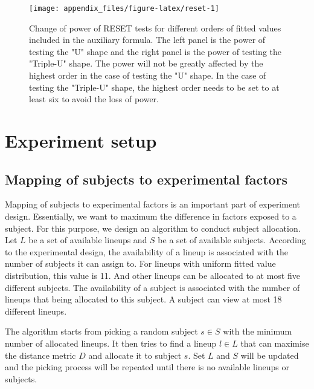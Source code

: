 \documentclass[]{interact}
\theoremstyle{plain}%
\theoremstyle{definition}
\theoremstyle{remark}
\begin{document}
\begin{figure}

{\centering \texttt{[image: appendix\_files/figure-latex/reset-1]} 

}

\caption{Change of power of RESET tests for different orders of fitted values included in the auxiliary formula. The left panel is the power of testing the "U" shape and the right panel is the power of testing the "Triple-U" shape. The power will not be greatly affected by the highest order in the case of testing the "U" shape. In the case of testing the "Triple-U" shape, the highest order needs to be set to at least six to avoid the loss of power.}\label{fig:reset}
\end{figure}

\newpage

\hypertarget{experiment-setup}{%
\section{Experiment setup}\label{experiment-setup}}

\hypertarget{mapping-of-subjects-to-experimental-factors}{%
\subsection{Mapping of subjects to experimental
factors}\label{mapping-of-subjects-to-experimental-factors}}

Mapping of subjects to experimental factors is an important part of
experiment design. Essentially, we want to maximum the difference in
factors exposed to a subject. For this purpose, we design an algorithm
to conduct subject allocation. Let \(L\) be a set of available lineups
and \(S\) be a set of available subjects. According to the experimental
design, the availability of a lineup is associated with the number of
subjects it can assign to. For lineups with uniform fitted value
distribution, this value is 11. And other lineups can be allocated to at
most five different subjects. The availability of a subject is
associated with the number of lineups that being allocated to this
subject. A subject can view at most 18 different lineups.

The algorithm starts from picking a random subject \(s \in S\) with the
minimum number of allocated lineups. It then tries to find a lineup
\(l \in L\) that can maximise the distance metric \(D\) and allocate it
to subject \(s\). Set \(L\) and \(S\) will be updated and the picking
process will be repeated until there is no available lineups or
subjects.
\end{document}
